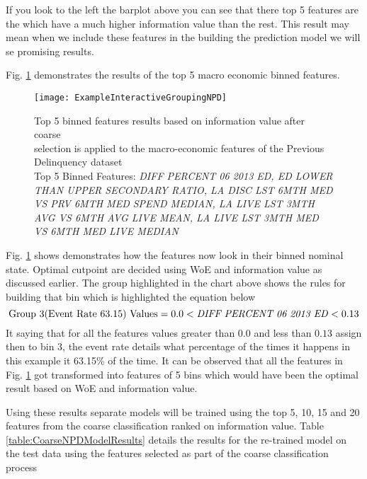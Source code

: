 If you look to the left the barplot above you can see that there top 5 features are the which have a much higher information value than the rest. This result may mean when we include these features in the building the prediction model we will se promising results.

Fig. \ref{fig:ExampleInteractiveGroupingNPD} demonstrates the results of the top 5 macro economic binned features.

\begin{figure}[H]
	\texttt{[image: ExampleInteractiveGroupingNPD]}
	\caption{Top 5 binned features results based on information value after coarse \\selection is applied to the macro-economic features of the Previous Delinquency dataset
		\\ Top 5 Binned Features: \textit{DIFF PERCENT 06 2013 ED, ED LOWER THAN UPPER SECONDARY RATIO, LA DISC LST 6MTH MED VS PRV 6MTH MED SPEND MEDIAN, LA LIVE LST 3MTH AVG VS 6MTH AVG LIVE MEAN, LA LIVE LST 3MTH MED VS 6MTH MED LIVE MEDIAN  }}
	\label{fig:ExampleInteractiveGroupingNPD}
\end{figure}

Fig. \ref{fig:ExampleInteractiveGroupingNPD} shows demonstrates how the features now look in their binned nominal state. Optimal cutpoint are decided using WoE and information value as discussed earlier. The group highlighted in the chart above shows the rules for building that bin which is highlighted the equation below
\[
\text{Group 3(Event Rate 63.15) Values} = 0.0 < \text{\textit{DIFF PERCENT 06 2013 ED}} < 0.13
\]
It saying that for all the features values greater than $0.0$ and less than $0.13$ assign then to bin 3, the event rate details what percentage of the times it happens in this example it 63.15\% of the time. It can be observed that all the features in Fig. \ref{fig:ExampleInteractiveGroupingNPD} got transformed into features of 5 bins which would have been the optimal result based on WoE and information value.

Using these results separate models will be trained using the top 5, 10, 15 and 20 features from
the coarse classification ranked on information value. Table \ref{table:CoarseNPDModelResults} details the results for the re-trained model
on the test data using the features selected as part of the coarse classification process

